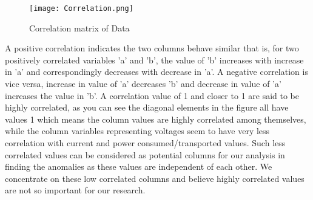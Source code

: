 \begin{enumerate}
\begin{enumerate}
\begin{figure}[tph!]
\centerline{\texttt{[image: Correlation.png]}}
\caption{Correlation matrix of Data}
\label{fig:correlation}
\end{figure}
A positive correlation indicates the two columns behave similar that is, for two positively correlated variables 'a' and 'b', the value of 'b' increases with increase in 'a' and correspondingly decreases with decrease in 'a'. A negative correlation is vice versa, increase in value of 'a' decreases 'b' and decrease in value of 'a' increases the value in 'b'.  A correlation value of 1 and closer to 1 are said to be highly correlated, as you can see the diagonal elements in the figure all have values 1 which means the column values are highly correlated among themselves, while the column variables representing voltages seem to have very less correlation with current and power consumed/transported  values. Such less correlated values can be considered as potential columns for our analysis in finding the anomalies as these values are independent of each other. We concentrate on these low correlated columns and believe highly correlated values are not so important for our research.


\end{enumerate}
\end{enumerate}
